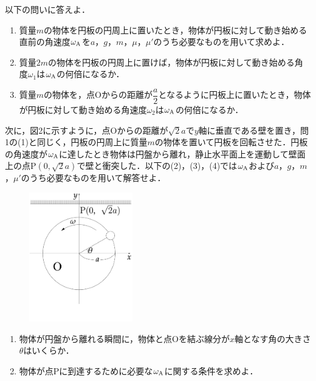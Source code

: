 \begin{enumerate}[label=\textbf{問\arabic*}]
  \item {\hzw}以下の問いに答えよ．
  \begin{enumerate}[(1)]
    \item {\hzw}質量$m$の物体を円板の円周上に置いたとき，物体が円板に対して動き始める直前の角速度$\omega_\mathrm{A}$を$a$，$g$，$m$，$\mu$，$\mu'$のうち必要なものを用いて求めよ．
    \item {\hzw}質量$2m$の物体を円板の円周上に置けば，物体が円板に対して動き始める角度$\omega_1$は$\omega_\mathrm{A}$の何倍になるか．
    \item {\hzw}質量$m$の物体を，点Oからの距離が$\dfrac{a}{2}$となるように円板上に置いたとき，物体が円板に対して動き始める角速度$\omega_2$は$\omega_\mathrm{A}$の何倍になるか．
  \end{enumerate}
  \begin{minipage}{0.6\linewidth}
  \item
      {\hzw}次に，図2に示すように，点Oからの距離が$\sqrt{2}a$で$y$軸に垂直である壁を置き，問1の(1)と同じく，円板の円周上に質量$m$の物体を置いて円板を回転させた．円板の角速度が$\omega_\mathrm{A}$に達したとき物体は円盤から離れ，静止水平面上を運動して壁面上の点P$(0, \sqrt{2}a)$で壁と衝突した．以下の(2)，(3)，(4)では$\omega_\mathrm{A}$および$a$，$g$，$m$，$\mu'$のうち必要なものを用いて解答せよ．
    \end{minipage}
    \begin{minipage}{0.3\linewidth}
    \setlength\abovecaptionskip{-3em}
    \begin{figure}[H]
      \centering
      \includegraphics[width=4.5cm]{fig/fig_1_13_2.pdf}
      \caption{}
    \end{figure}
    \end{minipage}
  \begin{enumerate}[(1)]
    \item {\hzw}物体が円盤から離れる瞬間に，物体と点Oを結ぶ線分が$x$軸となす角の大きさ$\theta$はいくらか．
    \item {\hzw}物体が点Pに到達するために必要な$\omega_\mathrm{A}$に関する条件を求めよ．

\end{enumerate}
\end{enumerate}
